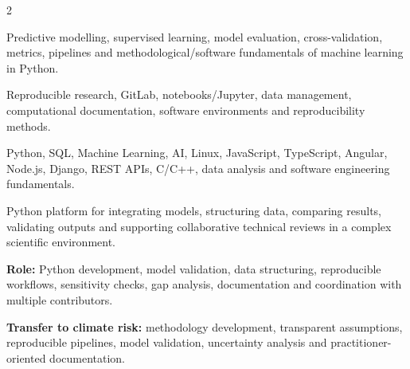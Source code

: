 \documentclass[8pt,a4paper,ragged2e,withhyper]{altacv}
\begin{document}
\begin{paracol}{2}



\small{
Predictive modelling, supervised learning, model evaluation, cross-validation, metrics, pipelines and methodological/software fundamentals of machine learning in Python.
}

\divider


\small{
Reproducible research, GitLab, notebooks/Jupyter, data management, computational documentation, software environments and reproducibility methods.
}

\divider


\small{
Python, SQL, Machine Learning, AI, Linux, JavaScript, TypeScript, Angular, Node.js, Django, REST APIs, C/C++, data analysis and software engineering fundamentals.
}

\end{paracol}



Python platform for integrating models, structuring data, comparing results, validating outputs and supporting collaborative technical reviews in a complex scientific environment.

\textbf{Role:} Python development, model validation, data structuring, reproducible workflows, sensitivity checks, gap analysis, documentation and coordination with multiple contributors.

\textbf{Transfer to climate risk:} methodology development, transparent assumptions, reproducible pipelines, model validation, uncertainty analysis and practitioner-oriented documentation.

\divider

\end{document}
